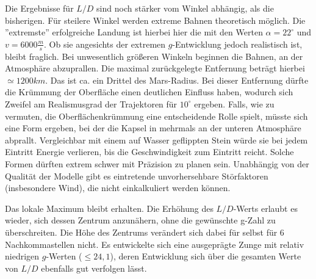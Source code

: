 Die Ergebnisse für $L/D$ sind noch stärker vom Winkel abhängig, als die bisherigen. Für steilere Winkel werden extreme Bahnen theoretisch möglich. Die ''extremste'' erfolgreiche Landung ist hierbei hier die mit den Werten $\alpha = 22^{\circ}$ und $v = 6000\frac{m}{s}$. Ob sie angesichts der extremen $g$-Entwicklung jedoch realistisch ist, bleibt fraglich. Bei unwesentlich größeren Winkeln beginnen die Bahnen, an der Atmosphäre abzuprallen. Die maximal zurückgelegte Entfernung beträgt hierbei $\simeq 1200km$. Das ist ca. ein Drittel des Mars-Radius. Bei dieser Entfernung dürfte die Krümmung der Oberfläche einen deutlichen Einfluss haben, wodurch sich Zweifel am Realismusgrad der Trajektoren für $10^{\circ}$ ergeben. Falls, wie zu vermuten, die Oberflächenkrümmung eine entscheidende Rolle spielt, müsste sich eine Form ergeben, bei der die Kapsel in mehrmals an der unteren Atmosphäre abprallt. Vergleichbar mit einem auf Wasser geflippten Stein würde sie bei jedem Eintritt Energie verlieren, bis die Geschwindigkeit zum Eintritt reicht. Solche Formen dürften extrem schwer mit Präzision zu planen sein. Unabhängig von der Qualität der Modelle gibt es eintretende unvorhersehbare Störfaktoren (insbesondere Wind), die nicht einkalkuliert werden können.

Das lokale Maximum bleibt erhalten. Die Erhöhung des $L/D$-Werts erlaubt es wieder, sich dessen Zentrum anzunähern, ohne die gewünschte g-Zahl zu überschreiten. Die Höhe des Zentrums verändert sich dabei für selbst für 6 Nachkommastellen nicht. Es entwickelte sich eine ausgeprägte Zunge mit relativ niedrigen $g$-Werten ($\leq 24,1$), deren Entwicklung sich über die gesamten Werte von $L/D$ ebenfalls gut verfolgen lässt.

